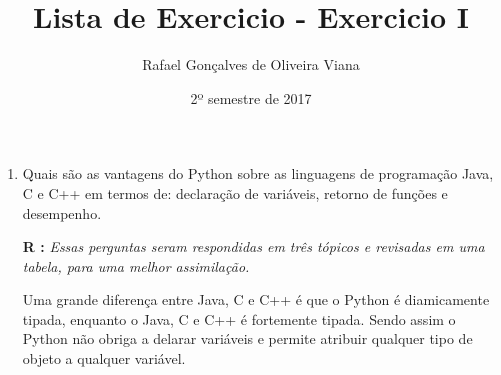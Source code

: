 \documentclass[12pt]{article}
\title{Lista de Exercicio  - Exercicio I }
\author{Rafael Gonçalves de  Oliveira Viana}
\date{2º semestre de 2017}
\begin{document}
\maketitle

\begin{enumerate}
\item
Quais são as vantagens do Python sobre as linguagens de programação Java, C e C++
em termos de: declaração de variáveis, retorno de funções e desempenho.


\textbf{R :}\textit{
	Essas perguntas seram respondidas em três tópicos e revisadas em uma tabela, para uma melhor assimilação.}
	
	 Uma grande diferença entre Java, C e C++ é que o Python é diamicamente tipada, enquanto o Java, C e C++ é fortemente tipada. Sendo assim o Python não obriga a delarar variáveis e permite atribuir qualquer tipo de objeto a qualquer variável.
	 
	 
	 
	 

\end{enumerate}
\end{document}
